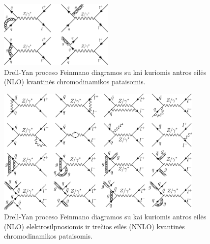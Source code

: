 \documentclass[a4paper, 12pt, oneside]{article}
\begin{document}
\begin{figure}[H]
	\includegraphics[width=0.5\textwidth]{Magistrinis/DY_NLO.png}
	\caption{\label{fig:DYNLO} Drell-Yan proceso Feinmano diagramos su kai kuriomis antros eilės (NLO) kvantinės chromodinamikos pataisomis.}
\end{figure}
\begin{figure}[H]
	\includegraphics[width=0.9\textwidth]{Magistrinis/DY_NNLO.png}
	\caption{\label{fig:DYNNLO} Drell-Yan proceso Feinmano diagramos su kai kuriomis antros eilės (NLO) elektrosilpnosiomis ir trečios eilės
	(NNLO) kvantinės chromodinamikos pataisomis.}
\end{figure}
\end{document}
